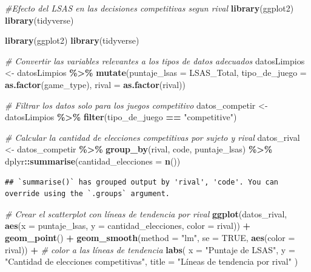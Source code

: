 \documentclass[
]{article}
\newenvironment{Shaded}{\begin{snugshade}}{\end{snugshade}}
\newcommand{\AttributeTok}[1]{\textcolor[rgb]{0.13,0.29,0.53}{#1}}
\newcommand{\CommentTok}[1]{\textcolor[rgb]{0.56,0.35,0.01}{\textit{#1}}}
\newcommand{\ConstantTok}[1]{\textcolor[rgb]{0.56,0.35,0.01}{#1}}
\newcommand{\FunctionTok}[1]{\textcolor[rgb]{0.13,0.29,0.53}{\textbf{#1}}}
\newcommand{\NormalTok}[1]{#1}
\newcommand{\OtherTok}[1]{\textcolor[rgb]{0.56,0.35,0.01}{#1}}
\newcommand{\SpecialCharTok}[1]{\textcolor[rgb]{0.81,0.36,0.00}{\textbf{#1}}}
\newcommand{\StringTok}[1]{\textcolor[rgb]{0.31,0.60,0.02}{#1}}
\begin{document}
\begin{Shaded}
\begin{Highlighting}[]
\CommentTok{\#Efecto del LSAS en las decisiones competitivas segun rival}
\FunctionTok{library}\NormalTok{(ggplot2)}
\FunctionTok{library}\NormalTok{(tidyverse)}

\FunctionTok{library}\NormalTok{(ggplot2)}
\FunctionTok{library}\NormalTok{(tidyverse)}


\CommentTok{\# Convertir las variables relevantes a los tipos de datos adecuados}
\NormalTok{datosLimpios }\OtherTok{\textless{}{-}}\NormalTok{ datosLimpios }\SpecialCharTok{\%\textgreater{}\%}
  \FunctionTok{mutate}\NormalTok{(}\AttributeTok{puntaje\_lsas =}\NormalTok{ LSAS\_Total, }\AttributeTok{tipo\_de\_juego =} \FunctionTok{as.factor}\NormalTok{(game\_type), }\AttributeTok{rival =} \FunctionTok{as.factor}\NormalTok{(rival))}

\CommentTok{\# Filtrar los datos solo para los juegos competitivo}
\NormalTok{datos\_competir }\OtherTok{\textless{}{-}}\NormalTok{ datosLimpios }\SpecialCharTok{\%\textgreater{}\%}
  \FunctionTok{filter}\NormalTok{(tipo\_de\_juego }\SpecialCharTok{==} \StringTok{"competitive"}\NormalTok{)}

\CommentTok{\# Calcular la cantidad de elecciones competitivas por sujeto y rival}
\NormalTok{datos\_rival }\OtherTok{\textless{}{-}}\NormalTok{ datos\_competir }\SpecialCharTok{\%\textgreater{}\%}
  \FunctionTok{group\_by}\NormalTok{(rival, code, puntaje\_lsas) }\SpecialCharTok{\%\textgreater{}\%}
\NormalTok{  dplyr}\SpecialCharTok{::}\FunctionTok{summarise}\NormalTok{(}\AttributeTok{cantidad\_elecciones =} \FunctionTok{n}\NormalTok{())}
\end{Highlighting}
\end{Shaded}

\begin{verbatim}
## `summarise()` has grouped output by 'rival', 'code'. You can override using the `.groups` argument.
\end{verbatim}

\begin{Shaded}
\begin{Highlighting}[]
\CommentTok{\# Crear el scatterplot con líneas de tendencia por rival}
\FunctionTok{ggplot}\NormalTok{(datos\_rival, }\FunctionTok{aes}\NormalTok{(}\AttributeTok{x =}\NormalTok{ puntaje\_lsas, }\AttributeTok{y =}\NormalTok{ cantidad\_elecciones, }\AttributeTok{color =}\NormalTok{ rival)) }\SpecialCharTok{+}
  \FunctionTok{geom\_point}\NormalTok{() }\SpecialCharTok{+}
  \FunctionTok{geom\_smooth}\NormalTok{(}\AttributeTok{method =} \StringTok{"lm"}\NormalTok{, }\AttributeTok{se =} \ConstantTok{TRUE}\NormalTok{, }\FunctionTok{aes}\NormalTok{(}\AttributeTok{color =}\NormalTok{ rival)) }\SpecialCharTok{+}  \CommentTok{\#  color a las líneas de tendencia}
  \FunctionTok{labs}\NormalTok{(}
    \AttributeTok{x =} \StringTok{"Puntaje de LSAS"}\NormalTok{,}
    \AttributeTok{y =} \StringTok{"Cantidad de elecciones competitivas"}\NormalTok{,}
    \AttributeTok{title =} \StringTok{"Líneas de tendencia por rival"}
\NormalTok{  )}
\end{Highlighting}
\end{Shaded}
\end{document}

